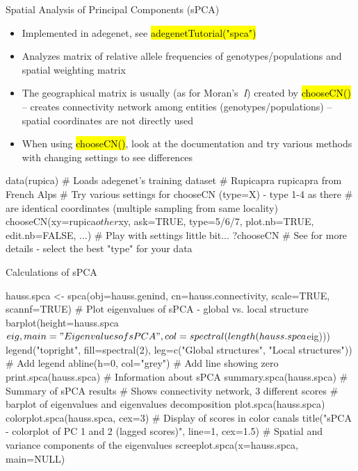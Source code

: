 \documentclass[compress, ucs, xelatex, 11pt, xcolor=svgnames,
  hyperref={
    bookmarks=true,
    unicode=true,
    colorlinks=true,
    pdftitle={Molecular data in R},
    plainpages=false,
    pdfauthor={Vojtech Zeisek},
    pdfsubject={Course about phylogeny and evolution in R},
    pdfcreator={XeLaTeX},
    pdfkeywords={R, evolution, phylogeny, molecular data},
    linkcolor=Tomato,
    anchorcolor=SaddleBrown,
    citecolor=Goldenrod,
    filecolor=DarkMagenta,
    menucolor=Sienna,
    urlcolor=DarkTurquoise,
    pdftex},
  url={hyphens, lowtilde} %
  ]{beamer}
\renewcommand{\texttt}[1]{\hl{\ttfamily #1}}
\begin{document}
\begin{frame}[fragile]{Spatial Analysis of Principal Components (sPCA)}
  \begin{itemize}
    \item Implemented in adegenet, see \texttt{adegenetTutorial("spca")}
    \item Analyzes matrix of relative allele frequencies of genotypes/populations and spatial weighting matrix
    \item The geographical matrix is usually (as for Moran's~\textit{I}) created by \texttt{chooseCN()} -- creates connectivity network among entities (genotypes/populations) -- spatial coordinates are not directly used
    \item When using \texttt{chooseCN()}, look at the documentation and try various methods with changing settings to see differences
  \end{itemize}
  \begin{spluscode}
    data(rupica) # Loads adegenet's training dataset
                 # Rupicapra rupicapra from French Alps
    # Try various settings for chooseCN (type=X) - type 1-4 as there
    # are identical coordinates (multiple sampling from same locality)
    chooseCN(xy=rupica$other$xy, ask=TRUE, type=5/6/7, plot.nb=TRUE,
      edit.nb=FALSE, ...) # Play with settings little bit...
    ?chooseCN # See for more details - select the best "type" for your data
  \end{spluscode}
\end{frame}

\begin{frame}[fragile]{Calculations of sPCA}
  \begin{spluscode}
    hauss.spca <- spca(obj=hauss.genind, cn=hauss.connectivity,
      scale=TRUE, scannf=TRUE)
    # Plot eigenvalues of sPCA - global vs. local structure
    barplot(height=hauss.spca$eig, main="Eigenvalues of sPCA",
      col=spectral(length(hauss.spca$eig)))
    legend("topright", fill=spectral(2), leg=c("Global structures",
      "Local structures")) # Add legend
    abline(h=0, col="grey") # Add line showing zero
    print.spca(hauss.spca) # Information about sPCA
    summary.spca(hauss.spca) # Summary of sPCA results
    # Shows connectivity network, 3 different scores
    # barplot of eigenvalues and eigenvalues decomposition
    plot.spca(hauss.spca)
    colorplot.spca(hauss.spca, cex=3) # Display of scores in color canals
    title("sPCA - colorplot of PC 1 and 2 (lagged scores)", line=1, cex=1.5)
    # Spatial and variance components of the eigenvalues
    screeplot.spca(x=hauss.spca, main=NULL)
  \end{spluscode}
\end{frame}
\end{document}
